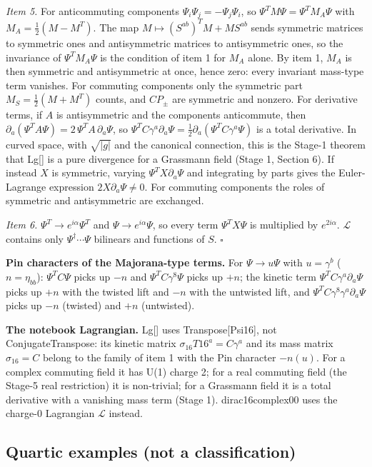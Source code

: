 \documentclass[11pt]{article}
\begin{document}
\emph{Item 5.} For anticommuting components $\Psi_i\Psi_j=-\Psi_j\Psi_i$, so $\Psi^TM\Psi=\Psi^TM_A\Psi$ with $M_A=\tfrac12(M-M^T)$. The map $M\mapsto(S^{ab})^TM+MS^{ab}$ sends symmetric matrices to symmetric ones and antisymmetric matrices to antisymmetric ones, so the invariance of $\Psi^TM_A\Psi$ is the condition of item 1 for $M_A$ alone. By item 1, $M_A$ is then symmetric and antisymmetric at once, hence zero: every invariant mass-type term vanishes. For commuting components only the symmetric part $M_S=\tfrac12(M+M^T)$ counts, and $CP_\pm$ are symmetric and nonzero. For derivative terms, if $A$ is antisymmetric and the components anticommute, then $\partial_a(\Psi^TA\Psi)=2\,\Psi^TA\,\partial_a\Psi$, so $\Psi^TC\gamma^a\partial_a\Psi=\tfrac12\partial_a(\Psi^TC\gamma^a\Psi)$ is a total derivative. In curved space, with $\sqrt{|g|}$ and the canonical connection, this is the Stage-1 theorem that Lg[] is a pure divergence for a Grassmann field (Stage 1, Section 6). If instead $X$ is symmetric, varying $\Psi^TX\partial_a\Psi$ and integrating by parts gives the Euler-Lagrange expression $2X\partial_a\Psi\ne0$. For commuting components the roles of symmetric and antisymmetric are exchanged.

\emph{Item 6.} $\Psi^T\to e^{i\alpha}\Psi^T$ and $\Psi\to e^{i\alpha}\Psi$, so every term $\Psi^TX\Psi$ is multiplied by $e^{2i\alpha}$. $\mathcal L$ contains only $\Psi^\dagger\cdots\Psi$ bilinears and functions of $S$. $\square$

\textbf{Pin characters of the Majorana-type terms.} For $\Psi\to u\Psi$ with $u=\gamma^b$ ($n=\eta_{bb}$): $\Psi^TC\Psi$ picks up $-n$ and $\Psi^TC\gamma^8\Psi$ picks up $+n$; the kinetic term $\Psi^TC\gamma^a\partial_a\Psi$ picks up $+n$ with the twisted lift and $-n$ with the untwisted lift, and $\Psi^TC\gamma^8\gamma^a\partial_a\Psi$ picks up $-n$ (twisted) and $+n$ (untwisted).

\textbf{The notebook Lagrangian.} Lg[] uses Transpose[Psi16], not ConjugateTranspose: its kinetic matrix $\sigma_{16}T16^a=C\gamma^a$ and its mass matrix $\sigma_{16}=C$ belong to the family of item 1 with the Pin character $-n(u)$. For a complex commuting field it has U(1) charge 2; for a real commuting field (the Stage-5 real restriction) it is non-trivial; for a Grassmann field it is a total derivative with a vanishing mass term (Stage 1). dirac16complex00 uses the charge-0 Lagrangian $\mathcal L$ instead.

\subsection{Quartic examples (not a classification)}
\end{document}
